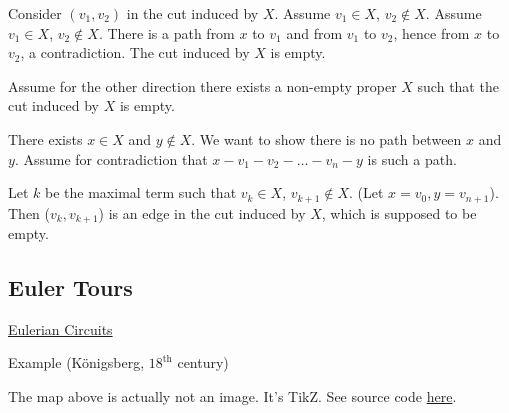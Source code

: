 \documentclass{article}
\begin{document}
Consider $(v_1, v_2)$ in the cut induced by $X$. Assume $v_1 \in X$, $v_2 \not\in X$. Assume $v_1 \in X$, $v_2 \not\in X$. There is a path from $x$ to $v_1$ and from $v_1$ to $v_2$, hence from $x$ to $v_2$, a contradiction. The cut induced by $X$ is empty. 

Assume for the other direction there exists a non-empty proper $X$ such that the cut induced by $X$ is empty. 

There exists $x \in X$ and $y \not\in X$. We want to show there is no path between $x$ and $y$. Assume for contradiction that $x-v_1-v_2 - \ldots -v_n -y$ is such a path. 

Let $k$ be the maximal term such that $v_k \in X$, $v_{k+1} \not\in X$. (Let $x = v_0, y = v_{n+1}$). Then ($v_k, v_{k+1}$) is an edge in the cut induced by $X$, which is supposed to be empty. 

\subsection{Euler Tours}

\underline{Eulerian Circuits}

Example (Königsberg, $18^{\text{th}}$ century)

\begin{center}

The map above is actually not an image. It's TikZ. See source code \href{https://tex.stackexchange.com/questions/183882/drawing-k%C3%B6nigsberg-landscape-showing-the-bridges}{here}.
\end{center}
\end{document}
